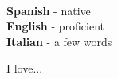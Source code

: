 \documentclass[9pt]{developercv} %
\begin{document}
\vspace{0.5cm}


\begin{minipage}[t]{0.4\textwidth} %

    \vspace{-\baselineskip} %


    \lorem \lorem \\ %
\end{minipage}
\hfill
\begin{minipage}[t]{0.2\textwidth}
    \vspace{-\baselineskip} %


    \textbf{Spanish} - native\\
    \textbf{English} - proficient\\
    \textbf{Italian} - a few words
\end{minipage}
\hfill
\begin{minipage}[t]{0.3\textwidth}
    \vspace{-\baselineskip} %


    I love... \lorem
\end{minipage}


\end{document}
